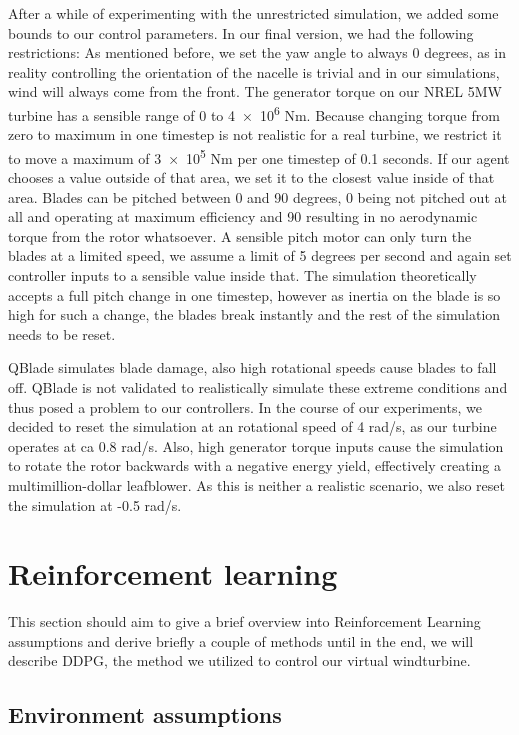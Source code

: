 \documentclass[hyperref,german,beleg]{cgvpub}
\begin{document}
After a while of experimenting with the unrestricted simulation, we added some bounds to our control parameters. In our final version, we had the following restrictions:
As mentioned before, we set the yaw angle to always 0 degrees, as in reality controlling the orientation of the nacelle is trivial and in our simulations, wind will always come from the front. The generator torque on our NREL 5MW turbine has a sensible range of \num{0} to \num{4e6} Nm.
Because changing torque from zero to maximum in one timestep is not realistic for a real turbine, we restrict it to move a maximum of \num{3e5} Nm per one timestep of 0.1 seconds. If our agent chooses a value outside of that area, we set it to the closest value inside of that area.
Blades can be pitched between 0 and 90 degrees, 0 being not pitched out at all and operating at maximum efficiency and 90 resulting in no aerodynamic torque from the rotor whatsoever. A sensible pitch motor can only turn the blades at a limited speed, we assume a limit of 5 degrees per second and again set controller inputs to a sensible value inside that. The simulation theoretically accepts a full pitch change in one timestep, however as inertia on the blade is so high for such a change, the blades break instantly and the rest of the simulation needs to be reset.

QBlade simulates blade damage, also high rotational speeds cause blades to fall off. QBlade is not validated to realistically simulate these extreme conditions and thus posed a problem to our controllers. In the course of our experiments, we decided to reset the simulation at an rotational speed of 4 rad/s, as our turbine operates at ca 0.8 rad/s. Also, high generator torque inputs cause the simulation to rotate the rotor backwards with a negative energy yield, effectively creating a multimillion-dollar leafblower. As this is neither a realistic scenario, we also reset the simulation at -0.5 rad/s. 

\section{Reinforcement learning}

This section should aim to give a brief overview into Reinforcement Learning assumptions and derive briefly a couple of methods until in the end, we will describe \ac{DDPG}, the method we utilized to control our virtual windturbine.

\subsection{Environment assumptions}
\end{document}
